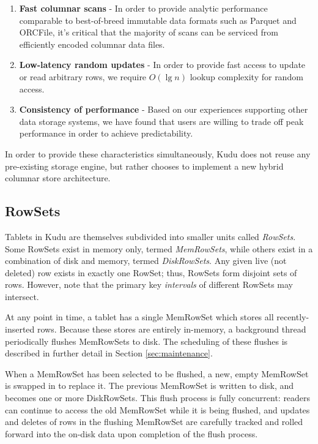 \documentclass[twocolumn,9pt]{article}
\begin{document}
\begin{enumerate}
\item {\bf Fast columnar scans} - In order to provide analytic performance comparable to
  best-of-breed immutable data formats such as Parquet and ORCFile\cite{orcfile}, it's critical
  that the majority of scans can be serviced from efficiently encoded columnar data files.
\item {\bf Low-latency random updates} - In order to provide fast access to update or read
  arbitrary rows, we require $O(\lg n)$ lookup complexity for random access.
\item {\bf Consistency of performance} - Based on our experiences supporting other
  data storage systems, we have found that users are willing to trade off peak performance
  in order to achieve predictability.
\end{enumerate}

In order to provide these characteristics simultaneously, Kudu does not reuse any
pre-existing storage engine, but rather chooses to implement a new hybrid columnar store
architecture.

\subsection{RowSets}

Tablets in Kudu are themselves subdivided into smaller units called {\em RowSets}.
Some RowSets exist in memory only, termed {\em MemRowSets}, while others
exist in a combination of disk and memory, termed {\em DiskRowSets}. Any given
live (not deleted) row exists in exactly one RowSet; thus, RowSets form disjoint
sets of rows. However, note that the primary key {\em intervals} of different RowSets
may intersect.

At any point in time, a tablet has a single MemRowSet which stores all recently-inserted
rows. Because these stores are entirely in-memory, a background thread periodically
flushes MemRowSets to disk. The scheduling of these flushes is described in further
detail in Section \ref{sec:maintenance}.

When a MemRowSet has been selected to be flushed, a new, empty MemRowSet is swapped in to
replace it. The previous MemRowSet is written to disk, and becomes one or more DiskRowSets.  This flush
process is fully concurrent: readers can continue to access the old MemRowSet while it is being
flushed, and updates and deletes of rows in the flushing MemRowSet are carefully tracked and rolled
forward into the on-disk data upon completion of the flush process.
\end{document}
